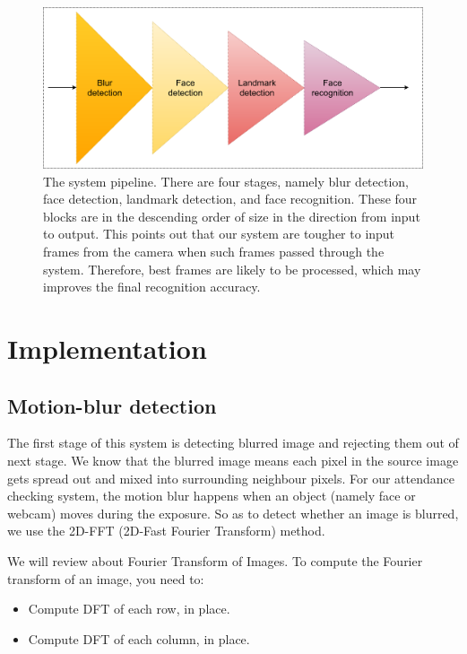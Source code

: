 \documentclass[journal, twocolumn]{IEEEtran}
\begin{document}
\begin{figure}
    \centering
    \includegraphics[width=\linewidth]{img/system-pipeline.png}
	\caption{The system pipeline. There are four stages, namely blur detection, face detection, landmark detection, and face recognition. These four blocks are in the descending order of size in the direction from input to output. This points out that our system are tougher to input frames from the camera when such frames passed through the system. Therefore, best frames are likely to be processed, which may improves the final recognition accuracy.}\label{fig:system}
\end{figure}


\medskip
\section{Implementation}
\label{implementation}


\subsection{Motion-blur detection}
\label{motion-blur-detection}

The first stage of this system is detecting blurred image and rejecting them out of next stage. We know that the blurred image means each pixel in the source image gets spread out and mixed into surrounding neighbour pixels. For our attendance checking system, the motion blur happens when an object (namely face or webcam) moves during the exposure. So as to detect whether an image is blurred, we use the 2D-FFT (2D-Fast Fourier Transform) method.

 We will review about Fourier Transform of Images. To compute the Fourier transform of an image, you need to:
\begin{itemize}
\item Compute DFT of each row, in place.
\item Compute DFT of each column, in place.
\end{itemize}  
\end{document}
